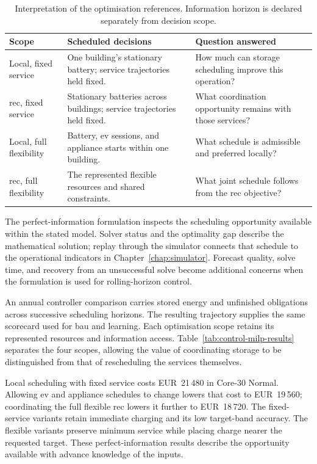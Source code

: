 \begin{table}[htbp]
\centering
\caption{Interpretation of the optimisation references. Information horizon is declared separately from decision scope.}
\label{tab:control-milp-scopes}
\small
\begin{tabularx}{\textwidth}{@{}p{}XX@{}}
\toprule
\textbf{Scope} & \textbf{Scheduled decisions} & \textbf{Question answered}\\
\midrule
Local, fixed service & One building's stationary battery; service trajectories held fixed. & How much can storage scheduling improve this operation?\\
\addlinespace
\gls{rec}, fixed service & Stationary batteries across buildings; service trajectories held fixed. & What coordination opportunity remains with those services?\\
\addlinespace
Local, full flexibility & Battery, \gls{ev} sessions, and appliance starts within one building. & What schedule is admissible and preferred locally?\\
\addlinespace
\gls{rec}, full flexibility & The represented flexible resources and shared constraints. & What joint schedule follows from the \gls{rec} objective?\\
\bottomrule
\end{tabularx}
\end{table}

The perfect-information formulation inspects the scheduling opportunity available within the stated model. Solver status and the optimality gap describe the mathematical solution; replay through the simulator connects that schedule to the operational indicators in Chapter~\ref{chap:simulator}. Forecast quality, solve time, and recovery from an unsuccessful solve become additional concerns when the formulation is used for rolling-horizon control.

An annual controller comparison carries stored energy and unfinished obligations across successive scheduling horizons. The resulting trajectory supplies the same scorecard used for \gls{bau} and learning. Each optimisation scope retains its represented resources and information access. Table~\ref{tab:control-milp-results} separates the four scopes, allowing the value of coordinating storage to be distinguished from that of rescheduling the services themselves.



\illustrativereading Local scheduling with fixed service costs EUR~21\,480 in Core-30 Normal. Allowing \gls{ev} and appliance schedules to change lowers that cost to EUR~19\,560; coordinating the full flexible \gls{rec} lowers it further to EUR~18\,720. The fixed-service variants retain immediate charging and its low target-band accuracy. The flexible variants preserve minimum service while placing charge nearer the requested target. These perfect-information results describe the opportunity available with advance knowledge of the inputs.

